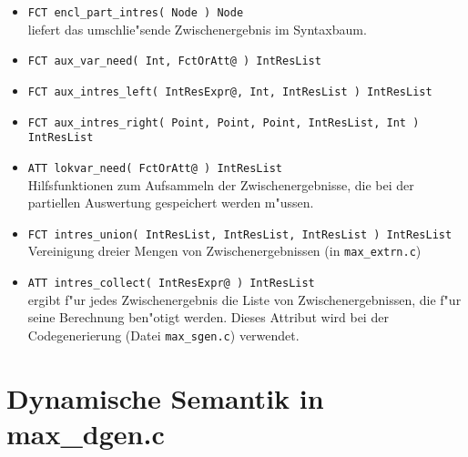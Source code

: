 \begin{itemize}
\item {\tt FCT encl\_part\_intres( Node ) Node}\\
liefert das umschlie"sende Zwischenergebnis im Syntaxbaum.

\item {\tt FCT aux\_var\_need( Int, FctOrAtt@ ) IntResList}\\


\item {\tt FCT aux\_intres\_left( IntResExpr@, Int, IntResList ) IntResList}
\item {\tt FCT aux\_intres\_right( Point, Point, Point, IntResList, Int ) IntResList}
\item {\tt ATT lokvar\_need( FctOrAtt@ ) IntResList}\\
Hilfsfunktionen zum Aufsammeln der Zwischenergebnisse, die bei der partiellen
Auswertung gespeichert werden m"ussen.

\item {\tt FCT intres\_union( IntResList, IntResList, IntResList ) IntResList}\\
Vereinigung dreier Mengen von Zwischenergebnissen (in {\tt max\_extrn.c})

\item {\tt ATT intres\_collect( IntResExpr@ ) IntResList}\\
ergibt f"ur jedes Zwischenergebnis die Liste von Zwischenergebnissen,
die f"ur seine Berechnung ben"otigt werden.
Dieses Attribut wird bei der Codegenerierung (Datei {\tt max\_sgen.c}) verwendet.
\end{itemize}


\newpage
\section{Dynamische Semantik in max\_dgen.c}

